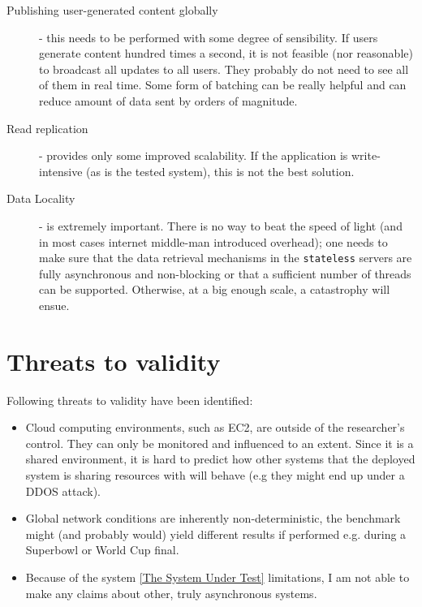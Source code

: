 \documentclass{uvamscse}
\begin{document}
\begin{description}
  \item[Publishing user-generated content globally] - this needs to be performed with some degree of sensibility. If users generate content hundred times a second, it is not feasible (nor reasonable) to broadcast all updates to all users. They probably do not need to see all of them in real time. Some form of batching can be really helpful and can reduce amount of data sent by orders of magnitude.
  \item[Read replication] - provides only some improved scalability. If the application is write-intensive (as is the tested system), this is not the best solution.
  \item[Data Locality] - is extremely important. There is no way to beat the speed of light (and in most cases internet middle-man introduced overhead); one needs to make sure that the data retrieval mechanisms in the \texttt{stateless} servers are fully asynchronous and non-blocking or that a sufficient number of threads can be supported. Otherwise, at a big enough scale, a catastrophy will ensue.
\end{description}


\section{Threats to validity}
Following threats to validity have been identified:
\begin{itemize}
  \item Cloud computing environments, such as EC2, are outside of the researcher's control. They can only be monitored and influenced to an extent. Since it is a shared environment, it is hard to predict how other systems that the deployed system is sharing resources with will behave (e.g they might end up under a DDOS attack).
  \item Global network conditions are inherently non-deterministic, the benchmark might (and probably would) yield different results if performed e.g. during a Superbowl or World Cup final.
  \item Because of the system \ref{The System Under Test} limitations, I am not able to make any claims about other, truly asynchronous systems.
\end{itemize}
\end{document}
